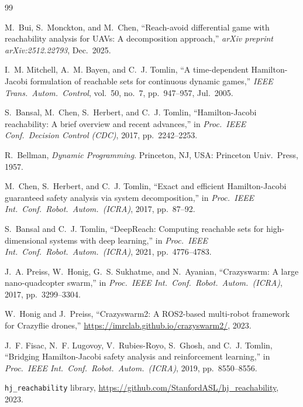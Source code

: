 \documentclass[conference]{IEEEtran}
\begin{document}

\begin{thebibliography}{99}

M.~Bui, S.~Monckton, and M.~Chen,
``Reach-avoid differential game with reachability analysis for UAVs: A decomposition approach,''
\emph{arXiv preprint arXiv:2512.22793}, Dec.\ 2025.

I.~M. Mitchell, A.~M. Bayen, and C.~J. Tomlin,
``A time-dependent Hamilton-Jacobi formulation of reachable sets for continuous dynamic games,''
\emph{IEEE Trans.\ Autom.\ Control}, vol.~50, no.~7, pp.~947--957, Jul.\ 2005.

S.~Bansal, M.~Chen, S.~Herbert, and C.~J. Tomlin,
``Hamilton-Jacobi reachability: A brief overview and recent advances,''
in \emph{Proc.\ IEEE Conf.\ Decision Control (CDC)}, 2017, pp.~2242--2253.

R.~Bellman,
\emph{Dynamic Programming}.
Princeton, NJ, USA: Princeton Univ.\ Press, 1957.

M.~Chen, S.~Herbert, and C.~J. Tomlin,
``Exact and efficient Hamilton-Jacobi guaranteed safety analysis via system decomposition,''
in \emph{Proc.\ IEEE Int.\ Conf.\ Robot.\ Autom.\ (ICRA)}, 2017, pp.~87--92.

S.~Bansal and C.~J. Tomlin,
``DeepReach: Computing reachable sets for high-dimensional systems with deep learning,''
in \emph{Proc.\ IEEE Int.\ Conf.\ Robot.\ Autom.\ (ICRA)}, 2021, pp.~4776--4783.

J.~A. Preiss, W.~Honig, G.~S. Sukhatme, and N.~Ayanian,
``Crazyswarm: A large nano-quadcopter swarm,''
in \emph{Proc.\ IEEE Int.\ Conf.\ Robot.\ Autom.\ (ICRA)}, 2017, pp.~3299--3304.

W.~Honig and J.~Preiss,
``Crazyswarm2: A ROS2-based multi-robot framework for Crazyflie drones,''
\url{https://imrclab.github.io/crazyswarm2/}, 2023.

J.~F. Fisac, N.~F. Lugovoy, V.~Rubies-Royo, S.~Ghosh, and C.~J. Tomlin,
``Bridging Hamilton-Jacobi safety analysis and reinforcement learning,''
in \emph{Proc.\ IEEE Int.\ Conf.\ Robot.\ Autom.\ (ICRA)}, 2019, pp.~8550--8556.

\texttt{hj\_reachability} library,
\url{https://github.com/StanfordASL/hj_reachability}, 2023.

\end{thebibliography}
\end{document}
